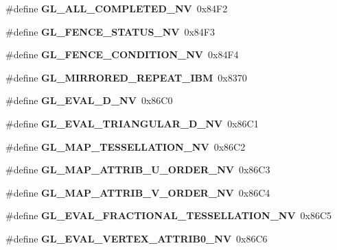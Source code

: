 \begin{DoxyCompactItemize}
\item 
\#define {\bfseries G\+L\+\_\+\+A\+L\+L\+\_\+\+C\+O\+M\+P\+L\+E\+T\+E\+D\+\_\+\+N\+V}~0x84\+F2\label{_s_d_l__opengl_8h_af898aac1ca2402680749e3dbe8cf94a5}

\item 
\#define {\bfseries G\+L\+\_\+\+F\+E\+N\+C\+E\+\_\+\+S\+T\+A\+T\+U\+S\+\_\+\+N\+V}~0x84\+F3\label{_s_d_l__opengl_8h_ab7fc7646ef3948e81380a5db1d2728b0}

\item 
\#define {\bfseries G\+L\+\_\+\+F\+E\+N\+C\+E\+\_\+\+C\+O\+N\+D\+I\+T\+I\+O\+N\+\_\+\+N\+V}~0x84\+F4\label{_s_d_l__opengl_8h_afc2a41db7ed2cda1d7dd1785b31338d4}

\item 
\#define {\bfseries G\+L\+\_\+\+M\+I\+R\+R\+O\+R\+E\+D\+\_\+\+R\+E\+P\+E\+A\+T\+\_\+\+I\+B\+M}~0x8370\label{_s_d_l__opengl_8h_ac22ff9e6c5573a2be2d97da145cb5a19}

\item 
\#define {\bfseries G\+L\+\_\+\+E\+V\+A\+L\+\_\+D\+\_\+\+N\+V}~0x86\+C0\label{_s_d_l__opengl_8h_af4d47cad474433a651c08b0a23def87e}

\item 
\#define {\bfseries G\+L\+\_\+\+E\+V\+A\+L\+\_\+\+T\+R\+I\+A\+N\+G\+U\+L\+A\+R\+\_\+D\+\_\+\+N\+V}~0x86\+C1\label{_s_d_l__opengl_8h_a94e66225ef3be6d7080efc967b7975f0}

\item 
\#define {\bfseries G\+L\+\_\+\+M\+A\+P\+\_\+\+T\+E\+S\+S\+E\+L\+L\+A\+T\+I\+O\+N\+\_\+\+N\+V}~0x86\+C2\label{_s_d_l__opengl_8h_a96ae91e6c7098faa0ea56be81949f8e4}

\item 
\#define {\bfseries G\+L\+\_\+\+M\+A\+P\+\_\+\+A\+T\+T\+R\+I\+B\+\_\+\+U\+\_\+\+O\+R\+D\+E\+R\+\_\+\+N\+V}~0x86\+C3\label{_s_d_l__opengl_8h_ad5fc8ac75c66df7fce687013f6289fb2}

\item 
\#define {\bfseries G\+L\+\_\+\+M\+A\+P\+\_\+\+A\+T\+T\+R\+I\+B\+\_\+\+V\+\_\+\+O\+R\+D\+E\+R\+\_\+\+N\+V}~0x86\+C4\label{_s_d_l__opengl_8h_a394db60e8be8f50d0fd0c29f7c11a628}

\item 
\#define {\bfseries G\+L\+\_\+\+E\+V\+A\+L\+\_\+\+F\+R\+A\+C\+T\+I\+O\+N\+A\+L\+\_\+\+T\+E\+S\+S\+E\+L\+L\+A\+T\+I\+O\+N\+\_\+\+N\+V}~0x86\+C5\label{_s_d_l__opengl_8h_a14c37304a9d4ac1c31f39c64dbec46f2}

\item 
\#define {\bfseries G\+L\+\_\+\+E\+V\+A\+L\+\_\+\+V\+E\+R\+T\+E\+X\+\_\+\+A\+T\+T\+R\+I\+B0\+\_\+\+N\+V}~0x86\+C6\label{_s_d_l__opengl_8h_a96a26ce861f84834f5bd6715c817ac9b}


\end{DoxyCompactItemize}
